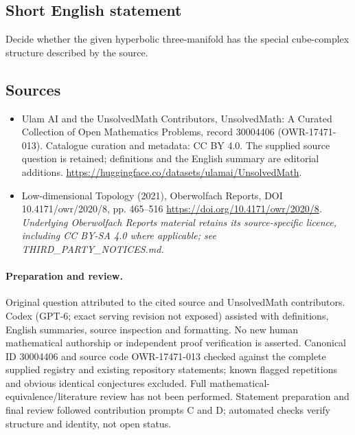 \documentclass[11pt]{article}
\begin{document}
\subsection{Short English statement}
Decide whether the given hyperbolic three-manifold has the special cube-complex structure described by the source.
\subsection{Sources}
\begin{itemize}
\item[\hypertarget{source:30004406:1}{S1}] Ulam AI and the UnsolvedMath Contributors, UnsolvedMath: A Curated Collection of Open Mathematics Problems, record 30004406 (OWR-17471-013). Catalogue curation and metadata: CC BY 4.0. The supplied source question is retained; definitions and the English summary are editorial additions.
\url{https://huggingface.co/datasets/ulamai/UnsolvedMath}.
\item[\hypertarget{source:30004406:2}{S2}] Low-dimensional Topology (2021), Oberwolfach Reports, DOI 10.4171/owr/2020/8, pp. 465--516
\url{https://doi.org/10.4171/owr/2020/8}.
\textit{Underlying Oberwolfach Reports material retains its source-specific licence, including CC BY-SA 4.0 where applicable; see THIRD\_PARTY\_NOTICES.md.}
\end{itemize}
\paragraph{Preparation and review.}
Original question attributed to the cited source and UnsolvedMath contributors. Codex (GPT-6; exact serving revision not exposed) assisted with definitions, English summaries, source inspection and formatting. No new human mathematical authorship or independent proof verification is asserted. Canonical ID 30004406 and source code OWR-17471-013 checked against the complete supplied registry and existing repository statements; known flagged repetitions and obvious identical conjectures excluded. Full mathematical-equivalence/literature review has not been performed. Statement preparation and final review followed contribution prompts C and D; automated checks verify structure and identity, not open status.
\label{end:30004406}
\end{document}
